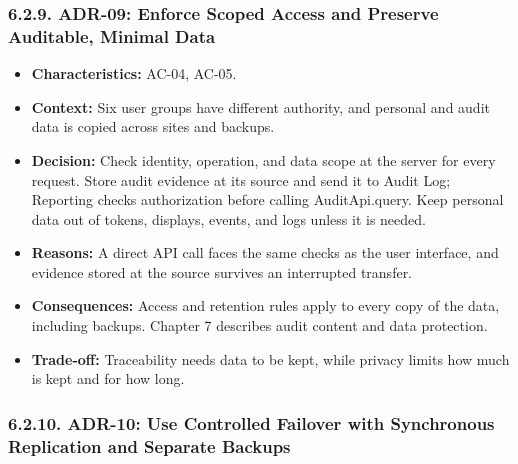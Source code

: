\subsubsection*{6.2.9. ADR-09: Enforce Scoped Access and Preserve Auditable, Minimal Data}

{}

\begin{itemize}[leftmargin=36pt, itemsep=2pt, topsep=4pt, parsep=2pt]
  \item \textbf{Characteristics:} AC-04, AC-05.
  \item \textbf{Context:} Six user groups have different authority, and personal and audit data is copied across sites and backups.
  \item \textbf{Decision:} Check identity, operation, and data scope at the server for every request. Store audit evidence at its source and send it to Audit Log; Reporting checks authorization before calling AuditApi.query. Keep personal data out of tokens, displays, events, and logs unless it is needed.
  \item \textbf{Reasons:} A direct API call faces the same checks as the user interface, and evidence stored at the source survives an interrupted transfer.
  \item \textbf{Consequences:} Access and retention rules apply to every copy of the data, including backups. Chapter 7 describes audit content and data protection.
  \item \textbf{Trade-off:} Traceability needs data to be kept, while privacy limits how much is kept and for how long.
\end{itemize}

\subsubsection*{6.2.10. ADR-10: Use Controlled Failover with Synchronous Replication and Separate Backups}

{}

